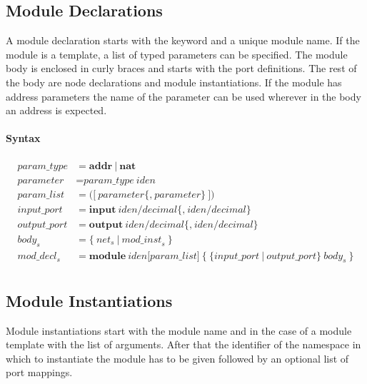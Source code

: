 \documentclass[a4paper,11pt,twoside]{report}
\begin{document}
{{{\subsection{Module Declarations}
A module declaration starts with the keyword  and a unique module name.
If the module is a template, a list of typed parameters can be specified.
The module body is enclosed in curly braces and starts with the port definitions.
The rest of the body are node declarations and module instantiations.
If the module has address parameters the name of the parameter can be used wherever in the body an address is expected.

\paragraph{Syntax}
\begin{align*}
    \textit{param\_type} & \mathop{=}
        \textbf{addr}\ |\ \textbf{nat}\\
    \textit{parameter} & \mathop{=}
        \textit{param\_type}\ \textit{iden}\\
    \textit{param\_list} & \mathop{=}
        \textbf{(}\big[\ 
            \textit{parameter}\big\{\textbf{,}\ \textit{parameter}\big\}\ 
        \big] \textbf{)}\\
    \textit{input\_port} & \mathop{=}
        \textbf{input}\ \textit{iden}\textbf{/}\textit{decimal}
        \big\{
            \textbf{,}\ \textit{iden}\textbf{/}\textit{decimal}
        \big\}\\
    \textit{output\_port} & \mathop{=}
        \textbf{output}\ \textit{iden}\textbf{/}\textit{decimal}
        \big\{
            \textbf{,}\ \textit{iden}\textbf{/}\textit{decimal}
        \big\}\\
    \textit{body}_s & \mathop{=}
        \big\{\ 
            \textit{net}_s\ |\ \textit{mod\_inst}_s\ 
        \big\}\\
    \textit{mod\_decl}_s & \mathop{=}
        \textbf{module}\ \textit{iden} \big[\textit{param\_list}\big]\ 
        \textbf{\{}\ 
            \big\{\textit{input\_port}\ |\ \textit{output\_port}\big\}\ 
            \textit{body}_s\ 
        \textbf{\}}\\
\end{align*}

\subsection{Module Instantiations}
Module instantiations start with the module name and in the case of a module template with the list of arguments.
After that the identifier of the namespace in which to instantiate the module has to be given followed by an optional list of port mappings.

}}}
\end{document}
